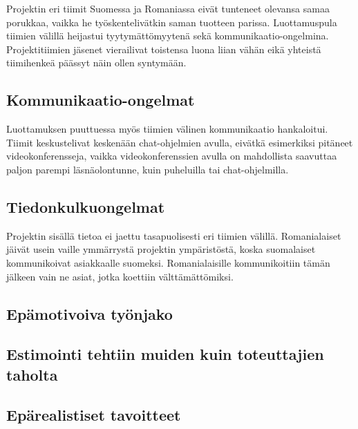 \documentclass[a4paper]{article}
\begin{document}
Projektin eri tiimit Suomessa ja Romaniassa eivät tunteneet olevansa samaa porukkaa, vaikka he työskentelivätkin saman tuotteen parissa. Luottamuspula tiimien välillä heijastui tyytymättömyytenä sekä kommunikaatio-ongelmina. Projektitiimien jäsenet vierailivat toistensa luona liian vähän eikä yhteistä tiimihenkeä päässyt näin ollen syntymään. 

\subsection{Kommunikaatio-ongelmat}

Luottamuksen puuttuessa myös tiimien välinen kommunikaatio hankaloitui. Tiimit keskustelivat keskenään chat-ohjelmien avulla, eivätkä esimerkiksi pitäneet videokonferensseja, vaikka videokonferenssien avulla on mahdollista saavuttaa paljon parempi läsnäolontunne, kuin puheluilla tai chat-ohjelmilla.

\subsection{Tiedonkulkuongelmat}

Projektin sisällä tietoa ei jaettu tasapuolisesti eri tiimien välillä. Romanialaiset jäivät usein vaille ymmärrystä projektin ympäristöstä, koska suomalaiset kommunikoivat asiakkaalle suomeksi. Romanialaisille kommunikoitiin tämän jälkeen vain ne asiat, jotka koettiin välttämättömiksi.

\subsection{Epämotivoiva työnjako}



\subsection{Estimointi tehtiin muiden kuin toteuttajien taholta}

\subsection{Epärealistiset tavoitteet}
\end{document}
